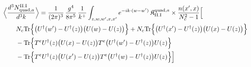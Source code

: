 \begingroup\small
\begin{align}\label{eq:S-II.I-2a}
&\Big\langle\frac{d^{3}N^{\rm II.I}_{{\rm quad},a}}{d^{3}k}\Big\rangle=\frac{1}{(2\pi)^{3}}\, \frac{g^{4}}{8\pi^{5}}\, \frac{1}{k^{+}} \int_{z,w,w',x,x'}e^{-ik\cdot(w-w')}\, \mathfrak{K}^{{\rm quad},a}_{\rm II.I} \times\frac{n(x',x)}{N_{c}^{2}-1}\Big[\notag\\
&\quad\quad N_{c}{\rm Tr}\Big\{\big(U^{\dagger}(w')-U^{\dagger}(z)\big)\big(U(w)-U(z)\big)\Big\} +N_{c}{\rm Tr}\Big\{\big(U^{\dagger}(x')-U^{\dagger}(z)\big)\big(U(x)-U(z)\big)\Big\}\notag\\
&\quad\quad -{\rm Tr}\Big\{T^{e}U^{\dagger}(z)\big(U(x)-U(z)\big)T^{e}\big(U^{\dagger}(w')-U^{\dagger}(z)\big)U(z)\Big\}\notag\\
&\quad\quad -{\rm Tr}\Big\{T^{e}U^{\dagger}(z)\big(U(x')-U(z)\big)T^{e}\big(U^{\dagger}(w)-U^{\dagger}(z)\big)U(z)\Big\}\Big]
\end{align}
\endgroup
